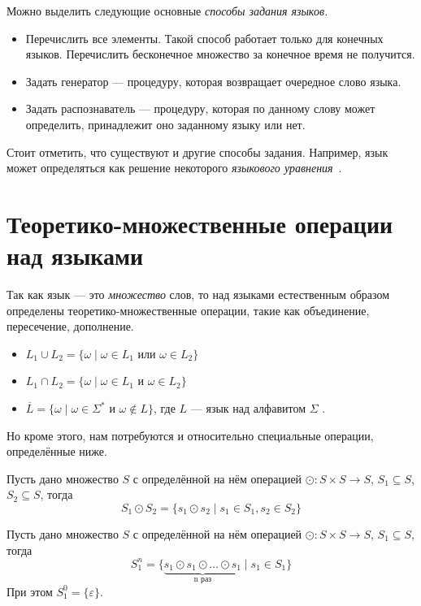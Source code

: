 Можно выделить следующие основные \textit{способы задания языков.}
\begin{itemize}
  \item Перечислить все элементы. Такой способ работает только для конечных языков. Перечислить бесконечное множество за конечное время не получится.
  \item Задать генератор --- процедуру, которая возвращает очередное слово языка.
  \item Задать распознаватель --- процедуру, которая по данному слову может определить, принадлежит оно заданному языку или нет.
\end{itemize}

Стоит отметить, что существуют и другие способы задания.
Например, язык может определяться как решение некоторого \textit{языкового уравнения}~.

\section{Теоретико-множественные операции над языками}

Так как язык --- это \textit{множество} слов, то над языками естественным образом определены теоретико-множественные операции, такие как объединение, пересечение, дополнение.
\begin{itemize}
  \item $L_1 \cup L_2 = \{ \omega \mid \omega \in L_1 \text{ или } \omega \in L_2\}$
  \item $L_1 \cap L_2 = \{ \omega \mid \omega \in L_1 \text{ и } \omega \in L_2\}$
  \item $\overline{L} = \{ \omega \mid \omega \in \Sigma^* \text{ и } \omega \notin L\}$, где $L$ --- язык над алфавитом $\Sigma$ .
\end{itemize}

Но кроме этого, нам потребуются и относительно специальные операции, определённые ниже.

\begin{definition}
  Пусть дано множество $S$ с определённой на нём операцией $\odot: S \times S \to S$, $S_1 \subseteq S$, $S_2 \subseteq S$, тогда
  $$
    S_1 \odot S_2 = \{ s_1 \odot s_2 \mid s_1 \in S_1, s_2 \in S_2\}
  $$
\end{definition}

\begin{definition}
  Пусть дано множество $S$ с определённой на нём операцией $\odot: S \times S \to S$, $S_1 \subseteq S$, тогда
  $$
    S_1 ^ n = \{ \underbrace{s_1 \odot s_1 \odot \ldots \odot s_1}_{\text{n раз}} \mid s_1 \in S_1\}
  $$
  При этом $S_1^0 = \{\varepsilon\}$.
\end{definition}

